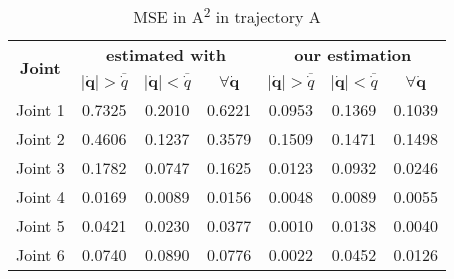 \begin{table}
\centering
\caption{MSE in \si{\ampere\squared} in trajectory A}
\label{tab:comparison-traj-a}
\begin{tabular}{c|ccc|ccc}
\multirow{2}{*}{\textbf{Joint}} & \multicolumn{3}{c|}{\textbf{estimated with \cite{gaz_model-based_2018}}} & \multicolumn{3}{c}{\textbf{our estimation}} \\
 & $\lvert \dot{\bm q}\rvert > \overline{\dot q}$ & $\lvert \dot{\bm q}\rvert < \overline{\dot q}$ & $\forall \dot{\bm q}$ & $\lvert \dot{\bm q}\rvert > \overline{\dot q}$ & $\lvert \dot{\bm q}\rvert < \overline{\dot q}$ & $\forall \dot{\bm q}$ \\ 
\hline
Joint 1 & 0.7325 & 0.2010 & 0.6221 & 0.0953 & 0.1369 & 0.1039 \\
Joint 2 & 0.4606 & 0.1237 & 0.3579 & 0.1509 & 0.1471 & 0.1498 \\
Joint 3 & 0.1782 & 0.0747 & 0.1625 & 0.0123 & 0.0932 & 0.0246 \\
Joint 4 & 0.0169 & 0.0089 & 0.0156 & 0.0048 & 0.0089 & 0.0055 \\
Joint 5 & 0.0421 & 0.0230 & 0.0377 & 0.0010 & 0.0138 & 0.0040 \\
Joint 6 & 0.0740 & 0.0890 & 0.0776 & 0.0022 & 0.0452 & 0.0126
\end{tabular}
\end{table}